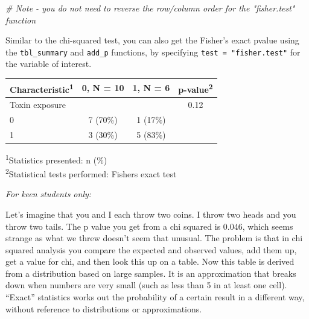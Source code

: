 \documentclass[]{book}
\newenvironment{Shaded}{\begin{snugshade}}{\end{snugshade}}
\newcommand{\CommentTok}[1]{\textcolor[rgb]{0.56,0.35,0.01}{\textit{#1}}}
\newcommand{\DataTypeTok}[1]{\textcolor[rgb]{0.13,0.29,0.53}{#1}}
\newcommand{\KeywordTok}[1]{\textcolor[rgb]{0.13,0.29,0.53}{\textbf{#1}}}
\newcommand{\NormalTok}[1]{#1}
\newcommand{\OperatorTok}[1]{\textcolor[rgb]{0.81,0.36,0.00}{\textbf{#1}}}
\newcommand{\StringTok}[1]{\textcolor[rgb]{0.31,0.60,0.02}{#1}}
\begin{document}
\begin{Shaded}
\begin{Highlighting}[]
\CommentTok{# Note - you do not need to reverse the row/column order for the "fisher.test" function}
\end{Highlighting}
\end{Shaded}

Similar to the chi-squared test, you can also get the Fisher's exact pvalue using the \texttt{tbl\_summary} and \texttt{add\_p} functions, by specifying \texttt{test\ =\ "fisher.test"} for the variable of interest.

\begin{Shaded}
\end{Shaded}

\captionsetup[table]{labelformat=empty,skip=1pt}
\begin{longtable}{lccc}
\toprule
\textbf{Characteristic}\textsuperscript{1} & \textbf{0}, N = 10 & \textbf{1}, N = 6 & \textbf{p-value}\textsuperscript{2} \\ 
\midrule
Toxin exposure &  &  & 0.12 \\ 
0 & 7 (70\%) & 1 (17\%) &  \\ 
1 & 3 (30\%) & 5 (83\%) &  \\ 
\bottomrule
\end{longtable}
\vspace{-5mm}
\begin{minipage}{\linewidth}
\textsuperscript{1}Statistics presented: n (\%) \\ 
\textsuperscript{2}Statistical tests performed: Fisher\textquotesingle{}s exact test \\ 
\end{minipage}

\emph{For keen students only:}

Let's imagine that you and I each throw two coins. I throw two heads and you throw two tails. The p value you get from a chi squared is 0.046, which seems strange as what we threw doesn't seem that unusual. The problem is that in chi squared analysis you compare the expected and observed values, add them up, get a value for chi, and then look this up on a table. Now this table is derived from a distribution based on large samples. It is an approximation that breaks down when numbers are very small (such as less than 5 in at least one cell). ``Exact'' statistics works out the probability of a certain result in a different way, without reference to distributions or approximations.
\end{document}
